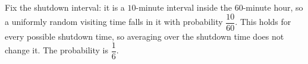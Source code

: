 Fix the shutdown interval: it is a $10$-minute interval inside the $60$-minute hour, so a uniformly random visiting time falls in it with probability $\dfrac{10}{60}$. This holds for every possible shutdown time, so averaging over the shutdown time does not change it. The probability is $\boxed{\dfrac16}$.
